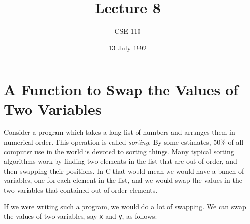 %
%
%


\def\brac#1{$<$#1$>$}
\def\Int{{\tt int}}
\def\int{\brac{\Int}}
\def\int{\brac{\Int}}
\def\Shortint{{\tt short~int}}
\def\shortint{\brac{\Shortint}}
\def\Longint{{\tt long~int}}
\def\longint{\brac{\Longint}}
\def\Float{{\tt float}}
\def\float{\brac{\Float}}
\def\Double{{\tt double}}
\def\double{\brac{\Double}}
\def\Char{{\tt char}}
\def\chr{\brac{\Char}}
\def\Void{{\tt void}}
\def\void{\brac{\Void}}

\def\p2#1{\brac{pointer~to #1}}

\def\breakhere{\mbox{$\otimes$}}
\parskip 8pt


\title{Lecture 8}
\author{CSE 110}
\date{13 July 1992}

\pagestyle{fancy}
\rhead{\thepage}
\cfoot{}





\maketitle

\section{A Function to Swap the Values of Two Variables}

    Consider a program which takes a long list of numbers and arranges
them in numerical order.  This operation is called {\em sorting}\/.  By
some estimates, 50\% of all computer use in the world is devoted to
sorting things.  Many typical sorting algorithms work by finding two
elements in the list that are out of order, and then swapping their
positions.  In C that would mean we would have a bunch of variables, one
for each element in the list, and we would swap the values in the two
variables that contained out-of-order elements.

    If we were writing such a program, we would do a lot of swapping.
We can swap the values of two variables, say {\tt x} and {\tt y}, as
follows:

